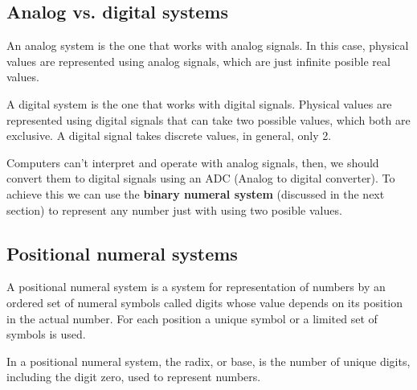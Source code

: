 
\subsection{Analog vs. digital systems}

\begin{definition}
    An analog system is the one that works with analog signals. In this case, physical values are represented using analog signals, which are just infinite posible real values.
\end{definition}
\begin{definition}
    A digital system is the one that works with digital signals. Physical values are represented using digital signals that can take two possible values, which both are exclusive. A digital signal takes discrete values, in general, only 2.
\end{definition}

Computers can't interpret and operate with analog signals, then, we should convert them to digital signals using an ADC (Analog to digital converter). To achieve this we can use the \textbf{binary numeral system} (discussed in the next section) to represent any number just with using two posible values.


\subsection{Positional  numeral systems}
\begin{definition}
    A positional numeral system is a system for representation of numbers by an ordered set of numeral symbols called digits whose value depends on its position in the actual number. For each position a unique symbol or a limited set of symbols is used.
\end{definition}
\begin{definition}
    In a positional numeral system, the radix, or base, is the number of unique digits, including the digit zero, used to represent numbers.
\end{definition}

